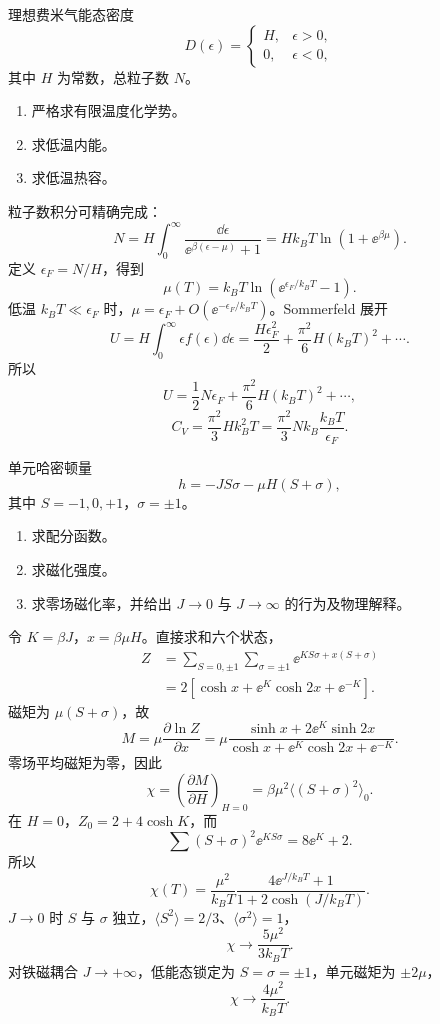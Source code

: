 \begin{question}[15 分]
理想费米气能态密度
\[D(\epsilon)=\begin{cases}H,&\epsilon>0,\\0,&\epsilon<0,\end{cases}\]
其中 $H$ 为常数，总粒子数 $N$。
\begin{enumerate}
\item 严格求有限温度化学势。
\item 求低温内能。
\item 求低温热容。
\end{enumerate}
\begin{solution}
粒子数积分可精确完成：
\[N=H\int_0^\infty\frac{\dd{\epsilon}}{\ee^{\beta(\epsilon-\mu)}+1}=Hk_BT\ln(1+\ee^{\beta\mu}).\]
定义 $\epsilon_F=N/H$，得到
\[\boxed{\mu(T)=k_BT\ln\!\left(\ee^{\epsilon_F/k_BT}-1\right)}.\]
低温 $k_BT\ll\epsilon_F$ 时，$\mu=\epsilon_F+O(\ee^{-\epsilon_F/k_BT})$。Sommerfeld 展开
\[U=H\int_0^\infty\epsilon f(\epsilon)\dd{\epsilon}=\frac{H\epsilon_F^2}{2}+\frac{\pi^2}{6}H(k_BT)^2+\cdots.\]
所以
\[\boxed{U=\frac12N\epsilon_F+\frac{\pi^2}{6}H(k_BT)^2+\cdots},\]
\[\boxed{C_V=\frac{\pi^2}{3}Hk_B^2T=\frac{\pi^2}{3}Nk_B\frac{k_BT}{\epsilon_F}}.\]
\end{solution}
\end{question}

\begin{question}[15 分]
单元哈密顿量
\[h=-JS\sigma-\mu H(S+\sigma),\]
其中 $S=-1,0,+1$，$\sigma=\pm1$。
\begin{enumerate}
\item 求配分函数。
\item 求磁化强度。
\item 求零场磁化率，并给出 $J\to0$ 与 $J\to\infty$ 的行为及物理解释。
\end{enumerate}
\begin{solution}
令 $K=\beta J$，$x=\beta\mu H$。直接求和六个状态，
\begin{align*}
Z&=\sum_{S=0,\pm1}\sum_{\sigma=\pm1}\ee^{KS\sigma+x(S+\sigma)}\\
&=\boxed{2\left[\cosh x+\ee^K\cosh2x+\ee^{-K}\right]}.
\end{align*}
磁矩为 $\mu(S+\sigma)$，故
\[\boxed{M=\mu\frac{\partial\ln Z}{\partial x}=\mu\frac{\sinh x+2\ee^K\sinh2x}{\cosh x+\ee^K\cosh2x+\ee^{-K}}}.\]
零场平均磁矩为零，因此
\[\chi=\left(\frac{\partial M}{\partial H}\right)_{H=0}=\beta\mu^2\langle(S+\sigma)^2\rangle_0.\]
在 $H=0$，$Z_0=2+4\cosh K$，而
\[\sum(S+\sigma)^2\ee^{KS\sigma}=8\ee^K+2.\]
所以
\[\boxed{\chi(T)=\frac{\mu^2}{k_BT}\frac{4\ee^{J/k_BT}+1}{1+2\cosh(J/k_BT)}}.\]
$J\to0$ 时 $S$ 与 $\sigma$ 独立，$\langle S^2\rangle=2/3$、$\langle\sigma^2\rangle=1$，
\[\boxed{\chi\to\frac{5\mu^2}{3k_BT}}.\]
对铁磁耦合 $J\to+\infty$，低能态锁定为 $S=\sigma=\pm1$，单元磁矩为 $\pm2\mu$，
\[\boxed{\chi\to\frac{4\mu^2}{k_BT}}.\]
\end{solution}
\end{question}
